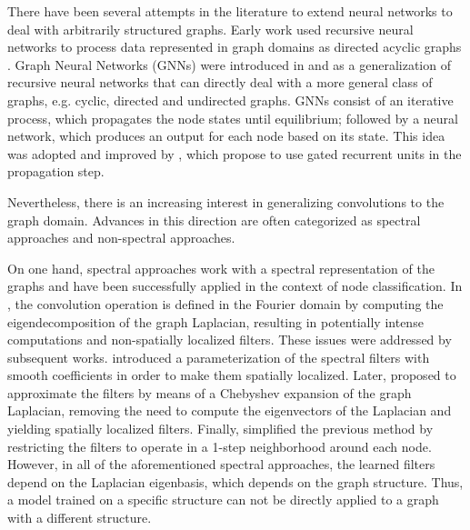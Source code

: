 \documentclass{article} \usepackage{iclr2018_conference,times}
\begin{document}
There have been several attempts in the literature to extend neural networks to deal with arbitrarily structured graphs. Early work used recursive neural networks to process data represented in graph domains as directed acyclic graphs \citep{frasconi1998general,Sperduti1997}. Graph Neural Networks (GNNs) were introduced in \cite{gori2005gnn} and \cite{scarselli2009graph} as a generalization of recursive neural networks that can directly deal with a more general class of graphs, e.g. cyclic, directed and undirected graphs. GNNs consist of an iterative process, which propagates the node states until equilibrium; followed by a neural network, which produces an output for each node based on its state. This idea was adopted and improved by \citet{li2015gated}, which propose to use gated recurrent units \citep{cho2014learning} in the propagation step.

Nevertheless, there is an increasing interest in generalizing convolutions to the graph domain. Advances in this direction are often categorized as spectral approaches and non-spectral approaches. 

On one hand, spectral approaches work with a spectral representation of the graphs and have been successfully applied in the context of node classification. In \cite{bruna2013spectral}, the convolution operation is defined in the Fourier domain by computing the eigendecomposition of the graph Laplacian, resulting in potentially intense computations and non-spatially localized filters. These issues were addressed by subsequent works. \cite{henaff2015deep} introduced a parameterization of the spectral filters with smooth coefficients in order to make them spatially localized. Later, \citet{defferrard2016convolutional} proposed to approximate the filters by means of a Chebyshev expansion of the graph Laplacian, removing the need to compute the eigenvectors of the Laplacian and yielding spatially localized filters. Finally, \cite{kipf2016semi} simplified the previous method by restricting the filters to operate in a 1-step neighborhood around each node. However, in all of the aforementioned spectral approaches, the learned filters depend on the Laplacian eigenbasis, which depends on the graph structure. Thus, a model trained on a specific structure can not be directly applied to a graph with a different structure.
\end{document}
